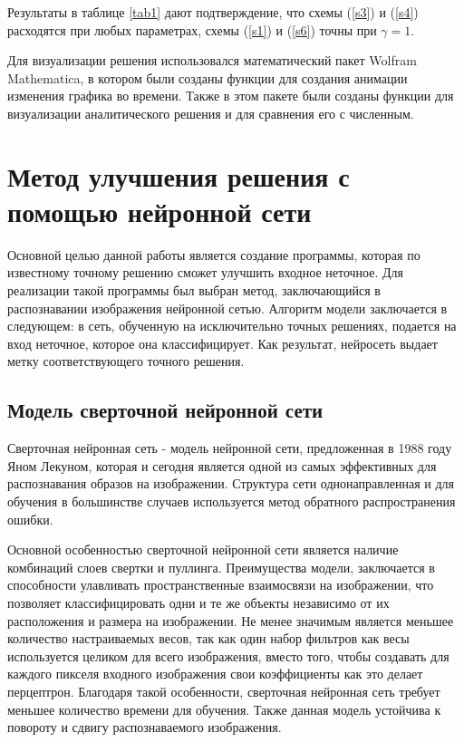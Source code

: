 \documentclass[12pt, a4paper]{article}
\begin{document}
Результаты в таблице \ref{tab1} дают подтверждение, что схемы (\ref{s3}) и (\ref{s4}) расходятся при любых параметрах, схемы (\ref{s1}) и (\ref{s6}) точны при $\gamma = 1$.

 Для визуализации решения использовался математический пакет Wolfram Mathematica, в котором были созданы функции для создания анимации изменения графика во времени. Также в этом пакете были созданы функции для визуализации аналитического решения и для сравнения его с численным.

\clearpage
\section{Метод улучшения решения с помощью нейронной сети}

Основной целью данной работы является создание программы, которая по известному точному решению сможет улучшить входное неточное. Для реализации такой программы был выбран метод, заключающийся в распознавании изображения нейронной сетью. Алгоритм модели заключается в следующем: в сеть, обученную на исключительно точных решениях, подается на вход неточное, которое она классифицирует. Как результат, нейросеть выдает метку соответствующего точного решения.

\subsection{Модель сверточной нейронной сети}

Сверточная нейронная сеть - модель нейронной сети, предложенная в 1988 году Яном Лекуном, которая и сегодня является одной из самых эффективных для распознавания образов на изображении. Структура сети однонаправленная и для обучения в большинстве случаев используется метод обратного распространения ошибки. \cite{2}

Основной особенностью сверточной нейронной сети является наличие комбинаций слоев свертки и пуллинга. Преимущества модели, заключается в способности улавливать пространственные взаимосвязи на изображении, что позволяет классифицировать одни и те же объекты независимо от их расположения и размера на изображении. Не менее значимым является меньшее количество настраиваемых весов, так как один набор фильтров как весы используется целиком для всего изображения, вместо того, чтобы создавать для каждого пикселя входного изображения свои коэффициенты как это делает перцептрон. Благодаря такой особенности, сверточная нейронная сеть требует меньшее количество времени для обучения. Также данная модель устойчива к повороту и сдвигу распознаваемого изображения. 
\end{document}

